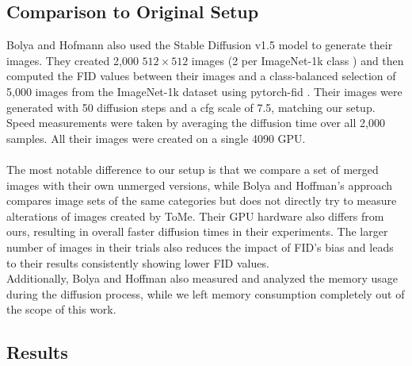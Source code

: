 \subsection{Comparison to Original Setup}
Bolya and Hofmann also used the Stable Diffusion v1.5 model to generate their images. They created 2,000 $512 \times 512$ images (2 per ImageNet-1k class \cite{deng2009imagenet}) and then computed the FID values between their images and a class-balanced selection of 5,000 images from the ImageNet-1k dataset using pytorch-fid \cite{Seitzer2020FID}. Their images were generated with 50 diffusion steps and a cfg scale of 7.5, matching our setup. Speed measurements were taken by averaging the diffusion time over all 2,000 samples. All their images were created on a single 4090 GPU.\\
\\
The most notable difference to our setup is that we compare a set of merged images with their own unmerged versions, while Bolya and Hoffman's approach compares image sets of the same categories but does not directly try to measure alterations of images created by ToMe. Their GPU hardware also differs from ours, resulting in overall faster diffusion times in their experiments. The larger number of images in their trials also reduces the impact of FID's bias and leads to their results consistently showing lower FID values.\\
Additionally, Bolya and Hoffman also measured and analyzed the memory usage during the diffusion process, while we left memory consumption completely out of the scope of this work.



\subsection{Results}




